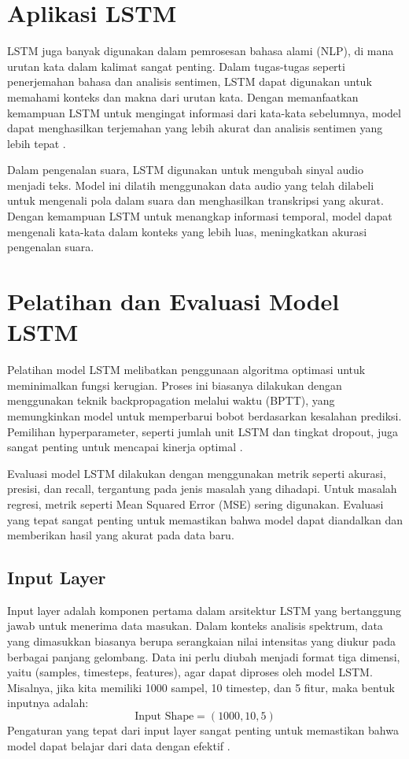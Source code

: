 \section{Aplikasi LSTM}
\par LSTM juga banyak digunakan dalam pemrosesan bahasa alami (NLP), di mana urutan kata dalam kalimat sangat penting. Dalam tugas-tugas seperti penerjemahan bahasa dan analisis sentimen, LSTM dapat digunakan untuk memahami konteks dan makna dari urutan kata. Dengan memanfaatkan kemampuan LSTM untuk mengingat informasi dari kata-kata sebelumnya, model dapat menghasilkan terjemahan yang lebih akurat dan analisis sentimen yang lebih tepat \citep{zhang2019}.

\par Dalam pengenalan suara, LSTM digunakan untuk mengubah sinyal audio menjadi teks. Model ini dilatih menggunakan data audio yang telah dilabeli untuk mengenali pola dalam suara dan menghasilkan transkripsi yang akurat. Dengan kemampuan LSTM untuk menangkap informasi temporal, model dapat mengenali kata-kata dalam konteks yang lebih luas, meningkatkan akurasi pengenalan suara.

\section{Pelatihan dan Evaluasi Model LSTM}
\par Pelatihan model LSTM melibatkan penggunaan algoritma optimasi untuk meminimalkan fungsi kerugian. Proses ini biasanya dilakukan dengan menggunakan teknik backpropagation melalui waktu (BPTT), yang memungkinkan model untuk memperbarui bobot berdasarkan kesalahan prediksi. Pemilihan hyperparameter, seperti jumlah unit LSTM dan tingkat dropout, juga sangat penting untuk mencapai kinerja optimal \citep{bengio2012}.

\par Evaluasi model LSTM dilakukan dengan menggunakan metrik seperti akurasi, presisi, dan recall, tergantung pada jenis masalah yang dihadapi. Untuk masalah regresi, metrik seperti Mean Squared Error (MSE) sering digunakan. Evaluasi yang tepat sangat penting untuk memastikan bahwa model dapat diandalkan dan memberikan hasil yang akurat pada data baru.



\subsection{Input Layer}
\par Input layer adalah komponen pertama dalam arsitektur LSTM yang bertanggung jawab untuk menerima data masukan. Dalam konteks analisis spektrum, data yang dimasukkan biasanya berupa serangkaian nilai intensitas yang diukur pada berbagai panjang gelombang. Data ini perlu diubah menjadi format tiga dimensi, yaitu (samples, timesteps, features), agar dapat diproses oleh model LSTM. Misalnya, jika kita memiliki 1000 sampel, 10 timestep, dan 5 fitur, maka bentuk inputnya adalah:
$$
\text{Input Shape} = (1000, 10, 5)
$$
Pengaturan yang tepat dari input layer sangat penting untuk memastikan bahwa model dapat belajar dari data dengan efektif \cite{hochreiter1997}.

